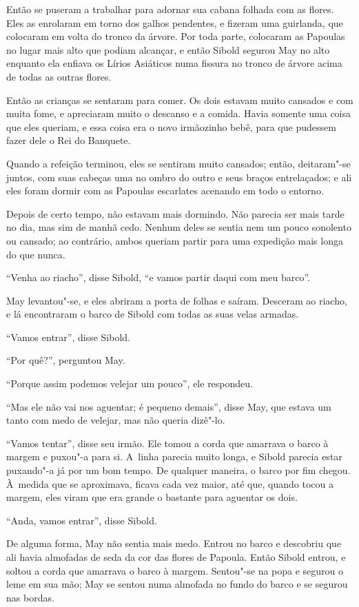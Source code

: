 Então se puseram a trabalhar para adornar sua cabana folhada com as
flores. Eles as enrolaram em torno dos galhos pendentes, e fizeram uma
guirlanda, que colocaram em volta do tronco da árvore. Por toda parte,
colocaram as Papoulas no lugar mais alto que podiam alcançar, e então
Sibold segurou May no alto enquanto ela enfiava os Lírios Asiáticos numa
fissura no tronco de árvore acima de todas as outras flores.

Então as crianças se sentaram para comer. Os dois estavam muito cansados
e com muita fome, e apreciaram muito o descanso e a comida. Havia
somente uma coisa que eles queriam, e essa coisa era o novo irmãozinho
bebê, para que pudessem fazer dele o Rei do Banquete.

Quando a refeição terminou, eles se sentiram muito cansados; então,
deitaram"-se juntos, com suas cabeças uma no ombro do outro e seus braços
entrelaçados; e ali eles foram dormir com as Papoulas escarlates
acenando em todo o entorno.

\smallskip

Depois de certo tempo, não estavam mais dormindo. Não parecia ser
mais tarde no dia, mas sim de manhã cedo. Nenhum deles se sentia nem um pouco
sonolento ou cansado; ao contrário, ambos queriam partir para uma
expedição mais longa do que nunca.

``Venha ao riacho'', disse Sibold, ``e vamos partir daqui com meu barco''.

May levantou"-se, e eles abriram a porta de folhas e saíram. Desceram ao
riacho, e lá encontraram o barco de Sibold com todas as suas velas
armadas.

``Vamos entrar'', disse Sibold.

``Por quê?'', perguntou May.

``Porque assim podemos velejar um pouco'', ele respondeu.

``Mas ele não vai nos aguentar; é pequeno demais'', disse May, que
estava um tanto com medo de velejar, mas não queria dizê"-lo.

``Vamos tentar'', disse seu irmão. Ele tomou a corda que amarrava o
barco à margem e puxou"-a para si. A~linha parecia muito longa, e Sibold
parecia estar puxando"-a já por um bom tempo. De qualquer maneira, o
barco por fim chegou. À~medida que se aproximava, ficava cada vez maior,
até que, quando tocou a margem, eles viram que era grande o bastante
para aguentar os dois.

``Anda, vamos entrar'', disse Sibold.

De alguma forma, May não sentia mais medo. Entrou no barco e descobriu
que ali havia almofadas de seda da cor das flores de Papoula. Então
Sibold entrou, e soltou a corda que amarrava o barco à margem. Sentou"-se
na popa e segurou o leme em sua mão; May se sentou numa almofada no
fundo do barco e se segurou nas bordas.


